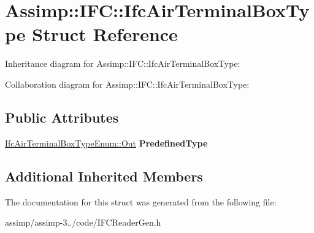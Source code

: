 \hypertarget{struct_assimp_1_1_i_f_c_1_1_ifc_air_terminal_box_type}{\section{Assimp\+:\+:I\+F\+C\+:\+:Ifc\+Air\+Terminal\+Box\+Type Struct Reference}
\label{struct_assimp_1_1_i_f_c_1_1_ifc_air_terminal_box_type}
}


Inheritance diagram for Assimp\+:\+:I\+F\+C\+:\+:Ifc\+Air\+Terminal\+Box\+Type\+:


Collaboration diagram for Assimp\+:\+:I\+F\+C\+:\+:Ifc\+Air\+Terminal\+Box\+Type\+:
\subsection*{Public Attributes}
\begin{DoxyCompactItemize}
\item 
\hypertarget{struct_assimp_1_1_i_f_c_1_1_ifc_air_terminal_box_type_ac1e05baa67c59d47926220e1af599bf2}{\hyperlink{classboost_1_1shared__ptr}{Ifc\+Air\+Terminal\+Box\+Type\+Enum\+::\+Out} {\bfseries Predefined\+Type}}\label{struct_assimp_1_1_i_f_c_1_1_ifc_air_terminal_box_type_ac1e05baa67c59d47926220e1af599bf2}

\end{DoxyCompactItemize}
\subsection*{Additional Inherited Members}


The documentation for this struct was generated from the following file\+:\begin{DoxyCompactItemize}
\item 
assimp/assimp-\/3../code/I\+F\+C\+Reader\+Gen.\+h\end{DoxyCompactItemize}
